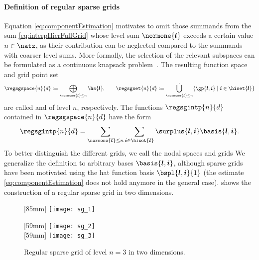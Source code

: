 \paragraph{Definition of regular sparse grids}

Equation \eqref{eq:componentEstimation} motivates to omit those summands
from the sum \eqref{eq:interpHierFullGrid} whose level sum $\normone{\*l}$
exceeds a certain value $n \in \natz$,
as their contribution can be neglected compared to the summands
with coarser level sums.
More formally, the selection of the relevant subspaces can be formulated as a
continuous knapsack problem~\cite{Bungartz04Sparse}.
The resulting function space and grid point set
\begin{equation}
  \label{eq:regularSG}
  \regsgspace{n}{d}
  := \bigoplus_{\normone{\*l} \le n} \hs{\*l},\qquad
  \regsgset{n}{d}
  := \bigdotcup_{\normone{\*l} \le n}
  \{\gp{\*l,\*i} \mid \*i \in \hiset{\*l}\}
\end{equation}
are called  and
 of level $n$, respectively.
The functions $\regsgintp{n}{d}$ contained in
$\regsgspace{n}{d}$ have the form
\begin{equation}
  \label{eq:regularSGInterpolant}
  \regsgintp{n}{d}
  = \sum_{\normone{\*l} \le n} \sum_{\*i \in \hiset{\*l}}
  \surplus{\*l,\*i} \basis{\*l,\*i}.
\end{equation}
To better distinguish the different grids,
we call the nodal spaces and grids 
We generalize the definition to arbitrary bases $\basis{\*l,\*i}$,
although sparse grids have been motivated using the hat function
basis $\bspl{\*l,\*i}{1}$
(the estimate \eqref{eq:componentEstimation} does not hold anymore
in the general case).
 shows the construction of a
regular sparse grid in two dimensions.

\begin{figure}
  [85mm]{%
    \texttt{[image: sg\_1]}%
  }%
  \hfill%
  \begin{minipage}[b]{59mm}
    [59mm]{%
      \texttt{[image: sg\_2]}%
    }\\[4mm]%
    [59mm]{%
      \texttt{[image: sg\_3]}%
    }%
  \end{minipage}%
  \caption[%
    Regular two-dimensional sparse grid%
  ]{%
    Regular sparse grid of level $n = 3$ in two dimensions.%
  }%
  \label{fig:regularSG}%
\end{figure}

